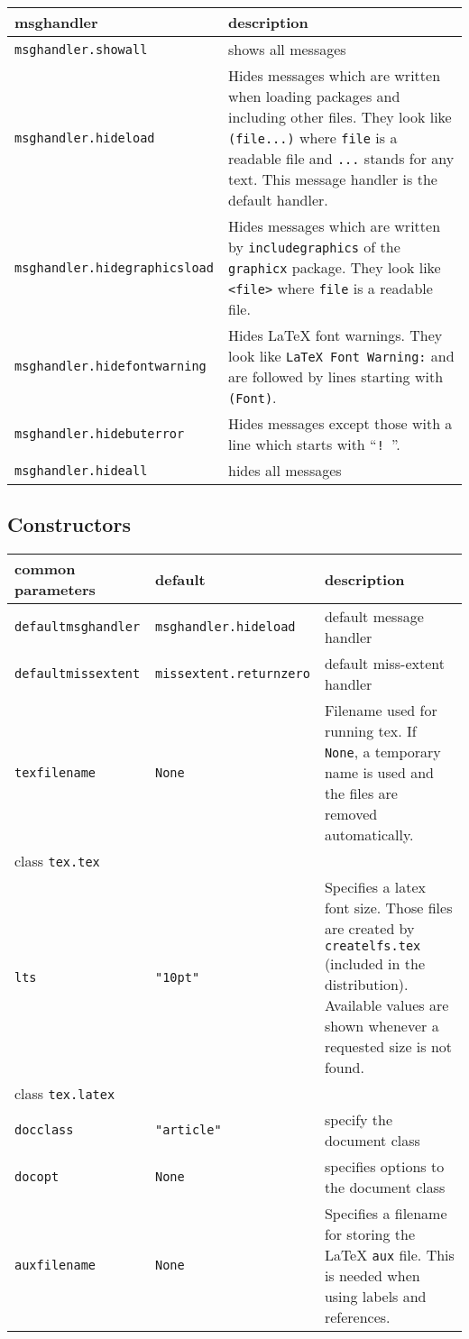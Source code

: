 \begin{description}
\bigskip
\begin{tabularx}{\linewidth}{l>{\raggedright\arraybackslash}X}
msghandler&description\\
\hline
\texttt{msghandler.showall}&shows all messages\\
\texttt{msghandler.hideload}&Hides messages which are written when loading
packages and including other files. They look like \texttt{(file...)}
where \texttt{file} is a readable file and \texttt{...} stands for any
text. This message handler is the default handler.\\
\texttt{msghandler.hidegraphicsload}&Hides messages which are written by
\texttt{includegraphics} of the \texttt{graphicx} package. They look like
\texttt{<file>} where \texttt{file} is a readable file.\\
\texttt{msghandler.hidefontwarning}&Hides \LaTeX{} font warnings. They
look like \texttt{LaTeX Font Warning:} and are followed by lines starting
with \texttt{(Font)}.\\
\texttt{msghandler.hidebuterror}&Hides messages except those
with a line which starts with ``\texttt{! }''.\\
\texttt{msghandler.hideall}&hides all messages\\
\end{tabularx}
\end{description}

\subsection{Constructors}

\bigskip
\begin{tabularx}{\linewidth}{ll>{\raggedright\arraybackslash}X}
common parameters&default&description\\
\hline
\texttt{defaultmsghandler}&\texttt{msghandler.hideload}&default message handler\\
\texttt{defaultmissextent}&\texttt{missextent.returnzero}&default
miss-extent handler\\
\texttt{texfilename}&\texttt{None}&Filename used for running tex. If
\texttt{None}, a temporary name is used and the files are removed automatically.\\
\hline
class \texttt{tex.tex}&&\\
\hline
\texttt{lts}&\texttt{"10pt"}&Specifies a latex font size. Those files are created
by \texttt{createlfs.tex} (included in the \PyX{} distribution). Available values
are shown whenever a requested size is not found.\\
\hline
class \texttt{tex.latex}&&\\
\hline
\texttt{docclass}&\texttt{"article"}&specify the document class\\
\texttt{docopt}&\texttt{None}&specifies options to the document class\\
\texttt{auxfilename}&\texttt{None}&Specifies a filename for storing the \LaTeX{}
\texttt{aux} file. This is needed when using labels and references.\\
\end{tabularx}


